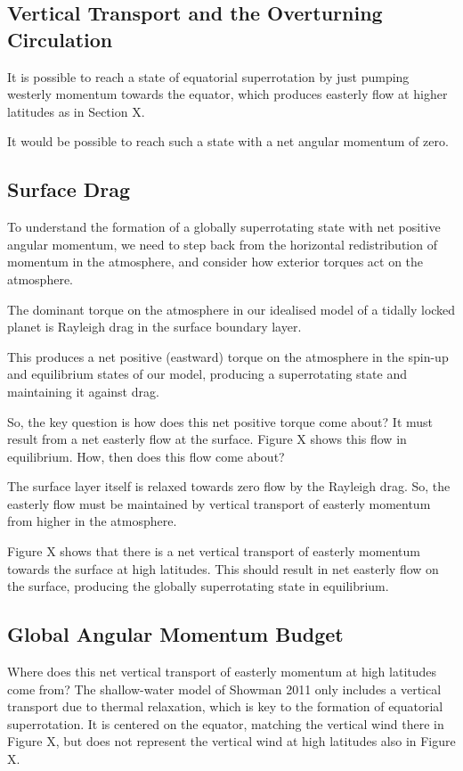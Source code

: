 \subsection*{Vertical Transport and the Overturning Circulation}

It is possible to reach a state of equatorial superrotation by just pumping westerly momentum towards the equator, which produces easterly flow at higher latitudes as in Section X.

It would be possible to reach such a state with a net angular momentum of zero.

\subsection*{Surface Drag}


To understand the formation of a globally superrotating state with net positive angular momentum, we need to step back from the horizontal redistribution of momentum in the atmosphere, and consider how exterior torques act on the atmosphere.

The dominant torque on the atmosphere in our idealised model of a tidally locked planet is Rayleigh drag in the surface boundary layer.

This produces a net positive (eastward) torque on the atmosphere in the spin-up and equilibrium states of our model, producing a superrotating state and maintaining it against drag.

So, the key question is how does this net positive torque come about? It must result from a net easterly flow at the surface. Figure X shows this flow in equilibrium. How, then does this flow come about?

The surface layer itself is relaxed towards zero flow by the Rayleigh drag. So, the easterly flow must be maintained by vertical transport of easterly momentum from higher in the atmosphere.

Figure X shows that there is a net vertical transport of easterly momentum towards the surface at high latitudes. This should result in net easterly flow on the surface, producing the globally superrotating state in equilibrium.


\subsection*{Global Angular Momentum Budget}


Where does this net vertical transport of easterly momentum at high latitudes come from? The shallow-water model of Showman 2011 only includes a vertical transport due to thermal relaxation, which is key to the formation of equatorial superrotation. It is centered on the equator, matching the vertical wind there in Figure X, but does not represent the vertical wind at high latitudes also in Figure X.

